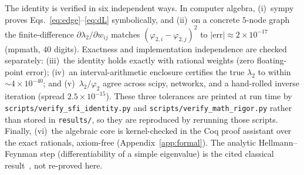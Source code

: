 \documentclass[11pt]{article}
\theoremstyle{definition}
\newcommand{\lam}{\lambda}
\newcommand{\phii}{\varphi}
\newcommand{\code}[1]{\texttt{#1}}
\begin{document}
The identity is verified in six independent ways. In computer algebra,
(i)~sympy proves Eqs.~\eqref{eq:edge}--\eqref{eq:dL}
symbolically, and (ii)~on a concrete $5$-node graph the finite-difference
$\partial\lam_2/\partial w_{ij}$ matches $(\phii_{2,i}-\phii_{2,j})^2$ to
$\lvert\text{err}\rvert\approx 2\times10^{-17}$ (mpmath, $40$ digits).
Exactness and implementation independence are checked separately:
(iii)~the identity holds exactly with rational weights (zero floating-point
error); (iv)~an interval-arithmetic enclosure certifies the true $\lam_2$ to
within $\sim\!4\times10^{-40}$; and (v)~$\lam_2/\phii_2$ agree across scipy,
networkx, and a
hand-rolled inverse iteration (spread $2.5\times10^{-15}$). These three
tolerances are printed at run time by \code{scripts/verify\_sfi\_identity.py} and
\code{scripts/verify\_math\_rigor.py} rather than stored in \code{results/}, so
they are reproduced by rerunning those scripts. Finally, (vi)~the
algebraic core is kernel-checked in the Coq proof assistant over the
exact rationals, axiom-free (Appendix~\ref{app:formal}). The analytic
Hellmann--Feynman step (differentiability of a simple eigenvalue) is the cited
classical result~\cite{ghosh2006}, not re-proved here.
\end{document}
